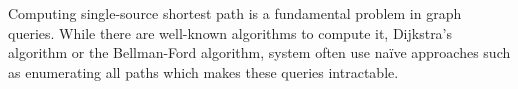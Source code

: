 
Computing single-source shortest path is a fundamental problem in graph queries.
While there are well-known algorithms to compute it, \eg Dijkstra's algorithm or
the Bellman-Ford algorithm, system often use na\"ive approaches such as
enumerating all paths which makes these queries intractable.


